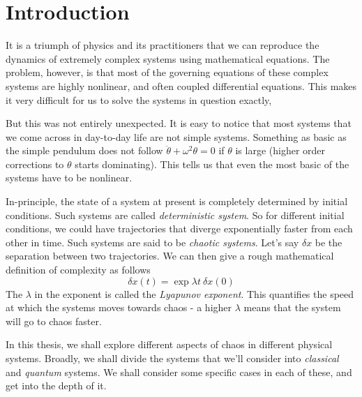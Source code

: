 
\chapter{Introduction} %

\label{Chapter1} %


It is a triumph of physics and its practitioners that we can reproduce the dynamics of extremely complex systems using mathematical equations. The problem, however, is that most of the governing equations of these complex systems are highly nonlinear, and often coupled differential equations. This makes it very difficult for us to solve the systems in question exactly, 

But this was not entirely unexpected. It is easy to notice that most systems that we come across in day-to-day life are not simple systems. Something as basic as the simple pendulum does not follow $\ddot{\theta} + \omega^2\theta = 0$ if $\theta$ is large (higher order corrections to $\theta$ starts dominating). This tells us that even the most basic of the systems have to be nonlinear.

In-principle, the state of a system at present is completely determined by initial conditions. Such systems are called \textit{deterministic system}. So for different initial conditions, we could have trajectories that diverge exponentially faster from each other in time. Such systems are said to be \textit{chaotic systems}. Let's say $\delta x$ be the separation between two trajectories. We can then give a rough mathematical definition of complexity as follows
$$\delta x(t) = \exp{\lambda t} \ \delta x(0)$$
The $\lambda$ in the exponent is called the \textit{Lyapunov exponent}. This quantifies the speed at which the systems moves towards chaos - a higher $\lambda$ means that the system will go to chaos faster.

In this thesis, we shall explore different aspects of chaos in different physical systems. Broadly, we shall divide the systems that we'll consider into \textit{classical} and \textit{quantum} systems. We shall consider some specific cases in each of these, and get into the depth of it.

\newpage

